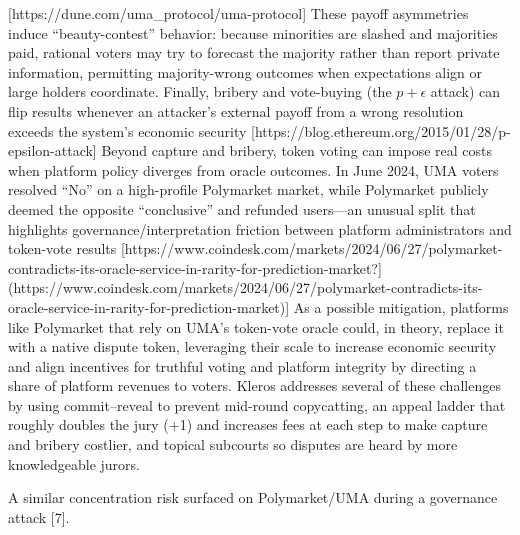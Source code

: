 [https://dune.com/uma\_protocol/uma-protocol]
These payoff asymmetries induce “beauty-contest” behavior: because minorities are slashed and majorities paid, rational voters may try to forecast the majority rather than report private information, permitting majority-wrong outcomes when expectations align or large holders coordinate. Finally, bribery and vote-buying (the $p+\epsilon $ attack) can flip results whenever an attacker’s external payoff from a wrong resolution exceeds the system’s economic security [https://blog.ethereum.org/2015/01/28/p-epsilon-attack]
Beyond capture and bribery, token voting can impose real costs when platform policy diverges from oracle outcomes. In June 2024, UMA voters resolved “No” on a high-profile Polymarket market, while Polymarket publicly deemed the opposite “conclusive” and refunded users—an unusual split that highlights governance/interpretation friction between platform administrators and token-vote results
[https://www.coindesk.com/markets/2024/06/27/polymarket-contradicts-its-oracle-service-in-rarity-for-prediction-market?](https://www.coindesk.com/markets/2024/06/27/polymarket-contradicts-its-oracle-service-in-rarity-for-prediction-market)]
As a possible mitigation, platforms like Polymarket that rely on UMA’s token-vote oracle could, in theory, replace it with a native dispute token, leveraging their scale to increase economic security and align incentives for truthful voting and platform integrity by directing a share of platform revenues to voters.
Kleros addresses several of these challenges by using commit–reveal to prevent mid-round copycatting, an appeal ladder that roughly doubles the jury (+1) and increases fees at each step to make capture and bribery costlier, and topical subcourts so disputes are heard by more knowledgeable jurors.

A similar concentration risk surfaced on Polymarket/UMA during a governance attack [7].

